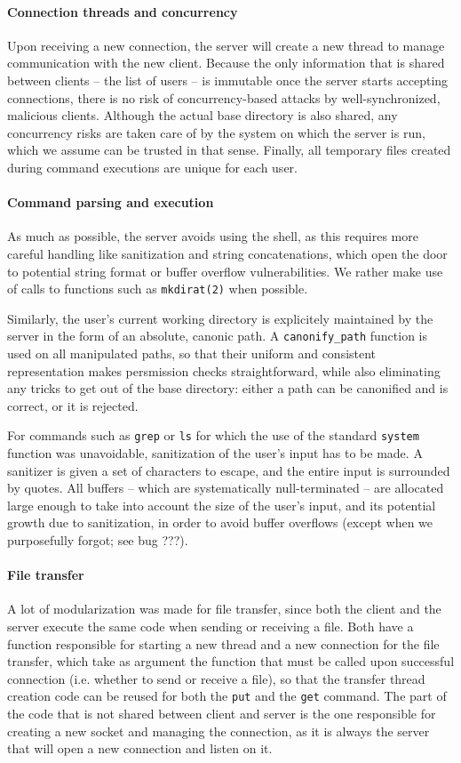 \documentclass[8pt, oneside, letterpaper]{book}
\renewcommand*{\[}{[\![}
\renewcommand*{\]}{]\!]}
\begin{document}
\paragraph {Connection threads and concurrency}
Upon receiving a new connection, the server will create a new thread to manage
communication with the new client. Because the only information that is shared
between clients -- the list of users -- is immutable once the server starts
accepting connections, there is no risk of concurrency-based attacks by
well-synchronized, malicious clients. Although the actual base directory is also
shared, any concurrency risks are taken care of by the system on which the
server is run, which we assume can be trusted in that sense. Finally, all
temporary files created during command executions are unique for each user.

\paragraph {Command parsing and execution}
As much as possible, the server avoids using the shell, as this requires more
careful handling like sanitization and string concatenations, which open the
door to potential string format or buffer overflow vulnerabilities. We rather
make use of calls to functions such as \texttt{mkdirat(2)} when possible.

Similarly, the user's current working directory is explicitely maintained by the
server in the form of an absolute, canonic path. A \texttt{canonify\_path}
function is used on all manipulated paths, so that their uniform and consistent
representation makes persmission checks straightforward, while also eliminating
any tricks to get out of the base directory: either a path can be canonified and
is correct, or it is rejected.

For commands such as \texttt{grep} or \texttt{ls} for which the use of the
standard \texttt{system} function was unavoidable, sanitization of the user's
input has to be made. A sanitizer is given a set of characters to escape, and
the entire input is surrounded by quotes. All buffers -- which are
systematically null-terminated -- are allocated large enough to take into
account the size of the user's input, and its potential growth due to
sanitization, in order to avoid buffer overflows (except when we purposefully
forgot; see bug ???).

\paragraph {File transfer}
A lot of modularization was made for file transfer, since both the client and
the server execute the same code when sending or receiving a file. Both have a
function responsible for starting a new thread and a new connection for the file
transfer, which take as argument the function that must be called upon
successful connection (i.e. whether to send or receive a file), so that the
transfer thread creation code can be reused for both the \texttt{put} and the
\texttt{get} command. The part of the code that is not shared between client and
server is the one responsible for creating a new socket and managing the
connection, as it is always the server that will open a new connection and
listen on it.
\end{document}
